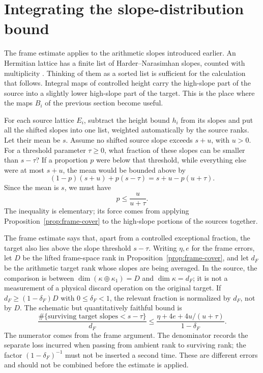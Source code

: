 \documentclass[11pt,openany,oneside]{scrbook}
\theoremstyle{definition}
\theoremstyle{remark}
\begin{document}
\section{Integrating the slope-distribution bound}\label{sec:slope-integration}

The frame estimate applies to the arithmetic slopes introduced earlier.  An Hermitian lattice has a finite list of Harder--Narasimhan slopes, counted with multiplicity \parencite{HarderNarasimhan1975}.  Thinking of them as a sorted list is sufficient for the calculation that follows.  Integral maps of controlled height carry the high-slope part of the source into a slightly lower high-slope part of the target.  This is the place where the maps $B_i$ of the previous section become useful.

For each source lattice $E_i$, subtract the height bound $h_i$ from its slopes and put all the shifted slopes into one list, weighted automatically by the source ranks.  Let their mean be $s$.  Assume no shifted source slope exceeds $s+u$, with $u>0$.  For a threshold parameter $\tau\ge0$, what fraction of these slopes can be smaller than $s-\tau$?  If a proportion $p$ were below that threshold, while everything else were at most $s+u$, the mean would be bounded above by
\[
(1-p)(s+u)+p(s-\tau)=s+u-p(u+\tau).
\]
Since the mean is $s$, we must have
\begin{equation}\label{eq:slope-tail}
p\le\frac{u}{u+\tau}.
\end{equation}
The inequality is elementary; its force comes from applying Proposition~\ref{prop:frame-cover} to the high-slope portions of the sources together.

The frame estimate says that, apart from a controlled exceptional fraction, the target also lies above the slope threshold $s-\tau$.  Writing $\eta,e$ for the frame errors, let $D$ be the lifted frame-space rank in Proposition~\ref{prop:frame-cover}, and let $d_F$ be the arithmetic target rank whose slopes are being averaged. In the source, the comparison is between $\dim(\kappa\oplus\kappa_1)=D$ and $\dim\kappa=d_F$; it is not a measurement of a physical discard operation on the original target.  If $d_F\ge(1-\delta_F)D$ with $0\le\delta_F<1$, the relevant fraction is normalized by $d_F$, not by $D$. The schematic but quantitatively faithful bound is
\begin{equation}\label{eq:target-tail}
\frac{\#\{\text{surviving target slopes}<s-\tau\}}{d_F}
\le\frac{\eta+4e+4u/(u+\tau)}{1-\delta_F}.
\end{equation}
The numerator comes from the frame argument.  The denominator records the separate loss incurred when passing from ambient rank to surviving rank; the factor $(1-\delta_F)^{-1}$ must not be inserted a second time. These are different errors and should not be combined before the estimate is applied.
\end{document}
